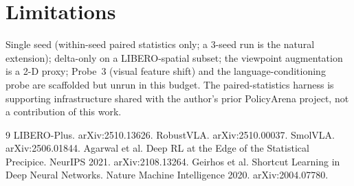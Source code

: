 \documentclass[11pt]{article}
\begin{document}
\section{Limitations}
Single seed (within-seed paired statistics only; a 3-seed run is the natural extension); delta-only
on a LIBERO-spatial subset; the viewpoint augmentation is a 2-D proxy; Probe~3 (visual feature
shift) and the language-conditioning probe are scaffolded but unrun in this budget. The
paired-statistics harness is supporting infrastructure shared with the author's prior PolicyArena
project, not a contribution of this work.

\begin{thebibliography}{9}
 LIBERO-Plus. arXiv:2510.13626.
 RobustVLA. arXiv:2510.00037.
 SmolVLA. arXiv:2506.01844.
 Agarwal et al. Deep RL at the Edge of the Statistical Precipice. NeurIPS 2021. arXiv:2108.13264.
 Geirhos et al. Shortcut Learning in Deep Neural Networks. Nature Machine Intelligence 2020. arXiv:2004.07780.
\end{thebibliography}
\end{document}

